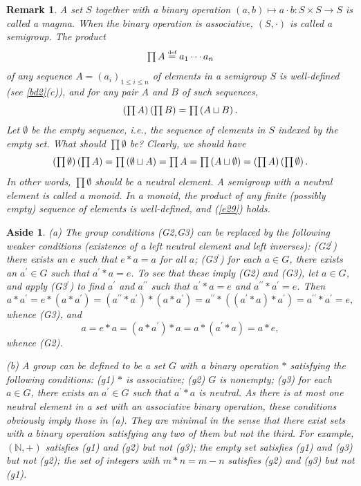 \documentclass[a4paper,11pt,final]{memoir}%
\newtheorem{remark}[X]{Remark}
\newtheorem{aside}[X]{Aside}
\theoremstyle{nonumberplain}
\begin{document}
\begin{remark}
\label{bd3g}A set $S$ together with a binary operation $(a,b)\mapsto a\cdot
b\colon S\times S\rightarrow S$ is called a \emph{magma}. When the binary
operation is associative, $(S,\cdot)$ is called a \emph{semigroup}. The
product%
\[
\tstyle\prod A\overset{\textup{{\tiny def}}}{=}a_{1}\cdots a_{n}%
\]
of any sequence $A=(a_{i})_{1\leq i\leq n}$ of elements in a semigroup $S$ is
well-defined (see \ref{bd2}(c)), and for any pair $A$ and $B$ of such
sequences,%
\begin{equation}
\tstyle\left(  \prod A\right)  \left(  \prod B\right)  =\prod\left(  A\sqcup
B\right)  \text{.} \label{e29}%
\end{equation}
Let $\emptyset$ be the empty sequence, i.e., the sequence of elements in $S$
indexed by the empty set. What should $\prod\emptyset$ be? Clearly, we should
have%
\[
\textstyle\left(  \prod\emptyset\right)  \left(  \prod A\right)  =\prod\left(
\emptyset\sqcup A\right)  =\prod A=\prod\left(  A\sqcup\emptyset\right)
=\left(  \prod A\right)  \left(  \prod\emptyset\right)  .
\]
In other words, $\prod\emptyset$ should be a neutral element. A semigroup with
a neutral element is called a \emph{monoid}. In a monoid, the product of any
finite (possibly empty) sequence of elements is well-defined, and (\ref{e29}) holds.
\end{remark}

\begin{aside}
\label{bd3z}(a) The group conditions (G2,G3) can be replaced by the following
weaker conditions (existence of a left neutral element and left inverses):
(G2$^{\prime}$) there exists an $e$ such that $e\ast a=a$ for all $a$;
(G3$^{\prime}$) for each $a\in G$, there exists an $a^{\prime}\in G$ such that
$a^{\prime}\ast a=e$. To see that these imply (G2) and (G3), let $a\in G$, and
apply (G3$^{\prime}$) to find $a^{\prime}$ and $a^{\prime\prime}$ such that
$a^{\prime}\ast a=e$ and $a^{\prime\prime}\ast a^{\prime}=e$. Then%
\[
a\ast a^{\prime}=e\ast(a\ast a^{\prime})=(a^{\prime\prime}\ast a^{\prime}%
)\ast(a\ast a^{\prime})=a^{\prime\prime}\ast\left(  (a^{\prime}\ast a)\ast
a^{\prime}\right)  =a^{\prime\prime}\ast a^{\prime}=e,
\]
whence (G3), and%
\[
a=e\ast a=(a\ast a^{\prime})\ast a=a\ast(a^{\prime}\ast a)=a\ast e,
\]
whence (G2).

(b) A group can be defined to be a set $G$ with a binary operation $\ast$
satisfying the following conditions: (g1) $\ast$ is associative; (g2) $G$ is
nonempty; (g3) for each $a\in G$, there exists an $a^{\prime}\in G$ such that
$a^{\prime}\ast a$ is neutral. As there is at most one neutral element in a
set with an associative binary operation, these conditions obviously imply
those in (a). They are minimal in the sense that there exist sets with a
binary operation satisfying any two of them but not the third. For example,
$(\mathbb{N}{},+)$ satisfies (g1) and (g2) but not (g3); the empty set
satisfies (g1) and (g3) but not (g2); the set of integers with $m*n=m-n$
satisfies (g2) and (g3) but not (g1).
\end{aside}
\end{document}
